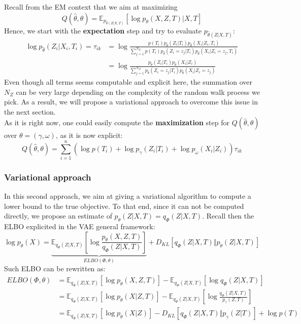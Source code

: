 Recall from the EM context that we aim at maximizing
$$
Q(\widehat{\theta}, \theta) = \mathbb{E}_{p_{\widehat{\theta}(Z|X,T)}}[\log p_{\theta}(X, Z, T) | X,T]
$$
Hence, we start with the \textbf{expectation} step and try to evaluate $p_{\widehat{\theta}(Z|X,T)}$:
$$
\begin{align}
    \log p_{\widehat{\theta}}(Z_i|X_i,T_i) = \tau_{ik} &= \log \frac{p(T_i) p_{\widehat{\theta}}(Z_i | T_i) p_{\widehat{\theta}}(X_i | Z_i, T_i)}{\sum_{j=1}^{N_Z} p(T_i) p_{\widehat{\theta}}(Z_i=z_j | T_i) p_{\widehat{\theta}}(X_i | Z_i=z_j, T_i)} \\
                                &= \log \frac{p_{\widehat{\theta}}(Z_i | T_i) p_{\widehat{\theta}}(X_i | Z_i)}{\sum_{j=1}^{N_Z} p_{\widehat{\theta}}(Z_i=z_j | T_i) p_{\widehat{\theta}}(X_i | Z_i=z_j)}
\end{align}
$$
Even though all terms seems computable and explicit here, the summation over $N_Z$ can be very large depending on the complexity of the random walk process we pick.
As a result, we will propose a variational approach to overcome this issue in the next section. \\

As it is right now, one could easily compute the \textbf{maximization} step for $Q(\widehat{\theta}, \theta)$ over $\theta = (\gamma, \omega)$, as it is now explicit:
$$
Q(\widehat{\theta}, \theta) = \sum_{i=1}^n (\log p(T_i) + \log p_{\gamma}(Z_i | T_i) + \log p_{\omega}(X_i | Z_i)) \tau_{ik}
$$

\subsubsection{Variational approach}

In this second approach, we aim at giving a variational algorithm to compute a lower bound to the true objective.
To that end, since it can not be computed directly, we propose an estimate of $p_{\theta}(Z|X,T) = q_{\Phi}(Z|X,T)$.
Recall then the ELBO explicited in the VAE general framework:
$$
\log p_{\theta}(X) = \underbrace{\mathbb{E}_{q_{\Phi}(Z|X,T)}\left[ \log \frac{p_{\theta}(X,Z,T)}{q_{\Phi}(Z|X,T)} \right]}_{ELBO(\Phi, \theta)} + D_{KL}[q_{\Phi}(Z|X,T) \Vert p_{\theta}(Z|X,T)]
$$
Such ELBO can be rewritten as:
$$
\begin{align}
    ELBO(\Phi, \theta) &= \mathbb{E}_{q_{\Phi}(Z|X,T)}[\log p_{\theta}(X,Z,T)] - \mathbb{E}_{q_{\Phi}(Z|X,T)}[\log q_{\Phi}(Z|X,T)] \\
                        &= \mathbb{E}_{q_{\Phi}(Z|X,T)}[\log p_{\theta}(X|Z,T)] - \mathbb{E}_{q_{\Phi}(Z|X,T)}\left[ \log \frac{q_{\Phi}(Z|X,T)}{p_{\gamma}(Z,T)} \right] \\
                        &= \mathbb{E}_{q_{\Phi}(Z|X,T)}[\log p_{\theta}(X|Z)] - D_{KL}[q_{\Phi}(Z|X,T) \Vert p_{\gamma}(Z|T)] + \log p(T)
\end{align}
$$

